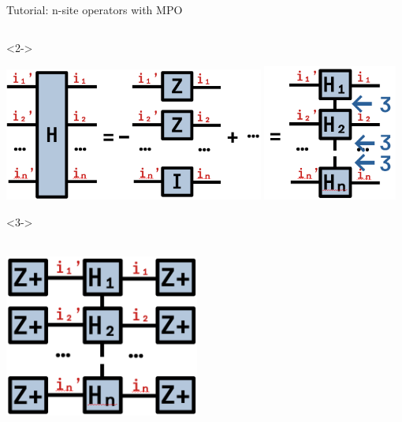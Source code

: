 \begin{frame}[fragile]{Tutorial: n-site operators with MPO}
\begin{columns}
\begin{column}{5.5cm}
\begin{onlyenv}<2->
\vspace*{0.0cm}
\begin{center}
\includegraphics[width=0.64\textwidth]{
  slides/assets/isingn.png
}
\includegraphics[width=0.33\textwidth]{
  slides/assets/isingn_mpo.png
}
\end{center}
\vspace*{0.0cm}
\end{onlyenv}


\begin{onlyenv}<3->
\vspace*{0.0cm}
~\\
~\\
\begin{center}
\includegraphics[width=0.48\textwidth]{
  slides/assets/Zpn_H_Zpn.png
}
\end{center}
\vspace*{0.0cm}
\end{onlyenv}
\end{column}

\end{columns}

\end{frame}
